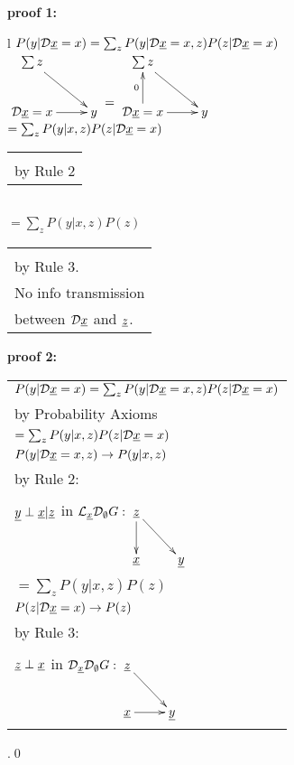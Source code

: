 \proof

{\bf * proof 1:}
\begin{longtable}{l}
\color{red}
$P(y|{\cal D}{\underline{x}}=x)=\sum_z
 P(y|{\cal D} {\underline{x}}=x, z)P(z|{\cal D}{\underline{x}} =x)$
\\
$\xymatrix{
\sum z\ar[dr]
\\
\cald \rvx=x\ar[r]
&y
}
\xymatrix{\\=}
\xymatrix{
\sum z\ar[dr]
\\
\cald \rvx=x\ar[r]\ar[u]^0
&y
}
$
\\
\color{red}
$=\sum_z P(y|x,z)P(z|{\cal D}{\underline{x}}=x)$
\\
\xymatrix{\\=}
\begin{tabular}{l}
\\
\\
by Rule 2
\end{tabular}
\\
\color{red}
$=\sum_z P(y|x,z)P(z)$
\\
\xymatrix{\\
=}
\begin{tabular}{l}\\
\\
by Rule 3.
\\
No info transmission\\
between ${\cal D}{\underline{x}}$ and ${\underline{z}}$.
\end{tabular}
\end{longtable}


{\bf * proof 2:}
\begin{longtable}{l}
\color{red}
$P(y|{\cal D}{\underline{x}}=x)
=
\sum_z
P(y|{\cal D}{\underline{x}}=x, z)
P(z|{\cal D}{\underline{x}}=x)$
\\
\quad by Probability Axioms
\\
\color{red}
$=\sum_z
P(y|x, z)
P(z|{\cal D}{\underline{x}}=x)$
\\
\quad $P(y|{\cal D} {\underline{x}}=x, z)\rightarrow
P(y|x, z)$
\\
\quad  by Rule 2:
\begin{tabular}{l}
\\
\end{tabular}
\\
\quad
${\underline{y}}\perp{\underline{x}}|{\underline{z}}$ in
$\call_\rvx\cald_\emptyset G:
\xymatrix{
\rvz\ar[d]\ar[rd]
\\
\rvx
&\rvy
}$
\\
\color{red}
$=\sum_z
P(y|x, z)
P(z)$
\\
\quad $P(z|{\cal D} {\underline{x}}=x)\rightarrow
P(z)$
\\
\quad  by Rule 3:
\begin{tabular}{l}
\\
\end{tabular}
\\
\quad
${\underline{z}}\perp {\underline{x}}$ in
$\cald_\rvx \cald_\emptyset G:
\xymatrix{
\rvz\ar[rd]
\\
\rvx\ar[r]
&\rvy
}
$
\end{longtable}
.\qed


